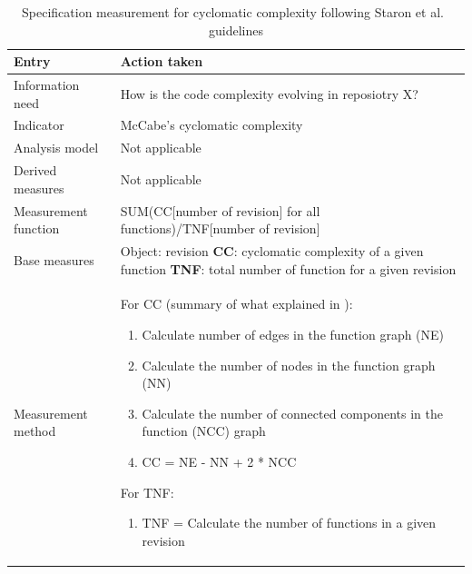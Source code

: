     \begin{table}[!htb]
		\centering
		\tabulinesep=1.2mm
		\begin{tabu} to \textwidth {|X|X[2]|}

			\hline
			\textbf{Entry} & \textbf{Action taken} \\
			\hline

			Information need & How is the code complexity evolving in reposiotry X? \\
			\hline

			Indicator & McCabe's \cite{cyclomatic_complexity} cyclomatic complexity \\
			\hline

			Analysis model & Not applicable \\
			\hline

			Derived measures & Not applicable \\
			\hline

			Measurement function & SUM(CC[number of revision] for all functions)/TNF[number of revision] \\
			\hline

			Base measures & Object: revision \newline
			                    \textbf{CC}: cyclomatic complexity of a given function \newline
			                    \textbf{TNF}: total number of function for a given revision \\
		    \hline

			Measurement method & For CC (summary of what explained in \cite{cyclomatic_complexity}):
			    \begin{enumerate}
			    \item Calculate number of edges in the function graph (NE)
			    \item Calculate the number of nodes in the function graph (NN)
			    \item Calculate the number of connected components in the function (NCC) graph
			    \item CC = NE - NN + 2 * NCC
			    \end{enumerate}

			For TNF:
			\begin{enumerate}
			\item TNF = Calculate the number of functions in a given revision
			\end{enumerate}

			\\
			\hline

		\end{tabu}
		\caption[Specification measurement for cyclomatic complexity]
        {Specification measurement for cyclomatic complexity following Staron et al.\ \cite{metrics_paper} guidelines}
        \label{tab:complexity_measurement_system}
    \end{table}

